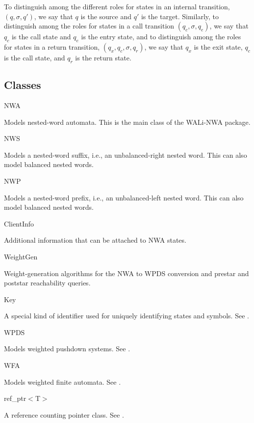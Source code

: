 To distinguish among the different roles for states in an internal
transition, $(q,\sigma,q')$, we say that $q$ is the source and $q'$ is the
target.  Similarly, to distinguish among the roles for states in a call
transition $(q_c,\sigma,q_e)$, we say that $q_c$ is the call state and $q_e$
is the entry state, and to distinguish among the roles for states in a return
transition, $(q_x,q_c,\sigma,q_r)$, we say that $q_x$ is the exit state,
$q_c$ is the call state, and $q_r$ is the return state.


\subsection{Classes}
\label{Se:Classes}

\begin{description}

\item NWA \nopagebreak

  Models nested-word automata.  This is the main class of the WALi-NWA package.

\item NWS \nopagebreak

  Models a nested-word suffix, i.e., an unbalanced-right nested word.  This
  can also model balanced nested words.

\item NWP \nopagebreak

  Models a nested-word prefix, i.e., an unbalanced-left nested word.  This
  can also model balanced nested words.

\item ClientInfo \nopagebreak

  Additional information that can be attached to NWA states.

\item WeightGen \nopagebreak

  Weight-generation algorithms for the NWA to WPDS conversion and prestar and
  poststar reachability queries.

\item Key \nopagebreak

  A special kind of identifier used for uniquely identifying states and
  symbols.  See \cite{wali}.

\item WPDS \nopagebreak

  Models weighted pushdown systems.  See \cite{wali}.

\item WFA \nopagebreak

  Models weighted finite automata.  See \cite{wali}.

\item ref\_ptr$<$T$>$ \nopagebreak

  A reference counting pointer class.  See \cite{wali}. \\

\end{description}


